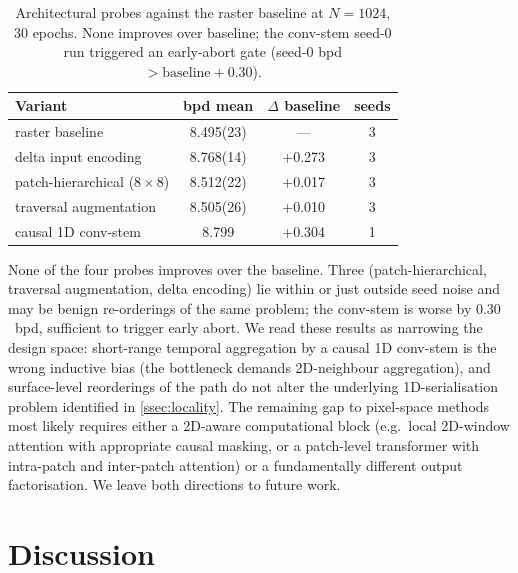 \documentclass[conference,a4paper]{IEEEtran}
\begin{document}
\begin{table}[t]
\centering
\caption{Architectural probes against the raster baseline at
  $N{=}1024$, 30 epochs. None improves over baseline; the
  conv-stem seed-0 run triggered an early-abort gate
  (seed-0 bpd $> \text{baseline} + 0.30$).}
\label{tab:probes}
\begin{tabular}{l S[table-format=1.3(3)] S[table-format=+1.3]
                S[table-format=1]}
\toprule
Variant & {bpd mean} & {$\Delta$ baseline} & {seeds} \\
\midrule
raster baseline                   & 8.495(23) & {---}  & 3 \\
delta input encoding              & 8.768(14) & +0.273 & 3 \\
patch-hierarchical ($8{\times}8$) & 8.512(22) & +0.017 & 3 \\
traversal augmentation            & 8.505(26) & +0.010 & 3 \\
causal 1D conv-stem               & {8.799}   & +0.304 & 1 \\
\bottomrule
\end{tabular}
\end{table}

None of the four probes improves over the baseline. Three
(patch-hierarchical, traversal augmentation, delta encoding) lie
within or just outside seed noise and may be benign re-orderings
of the same problem; the conv-stem is worse by $0.30$~bpd,
sufficient to trigger early abort. We read these results as
narrowing the design space: short-range temporal aggregation by a
causal 1D conv-stem is the wrong inductive bias (the bottleneck
demands 2D-neighbour aggregation), and surface-level reorderings
of the path do not alter the underlying 1D-serialisation problem
identified in \cref{ssec:locality}. The remaining gap to
pixel-space methods most likely requires either a 2D-aware
computational block (e.g.\ local 2D-window attention with
appropriate causal masking, or a patch-level transformer with
intra-patch and inter-patch attention) or a fundamentally
different output factorisation. We leave both directions to
future work.

\section{Discussion}\label{sec:discussion}
\end{document}
